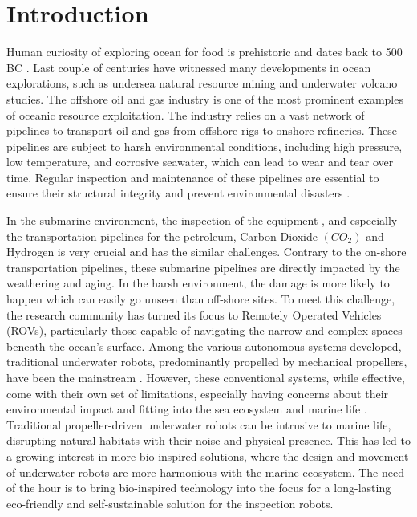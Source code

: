 \documentclass[pdflatex,sn-mathphys-num]{sn-jnl}
\theoremstyle{thmstyleone}%
\begin{document}
\section{Introduction}\label{intro}
\par Human curiosity of exploring ocean for food is prehistoric and dates back to 500 BC \cite{SUBMON}. Last couple of centuries have witnessed many developments in ocean explorations, such as undersea natural resource mining and underwater volcano studies. The offshore oil and gas industry is one of the most prominent examples of oceanic resource exploitation. The industry relies on a vast network of pipelines to transport oil and gas from offshore rigs to onshore refineries. These pipelines are subject to harsh environmental conditions, including high pressure, low temperature, and corrosive seawater, which can lead to wear and tear over time. Regular inspection and maintenance of these pipelines are essential to ensure their structural integrity and prevent environmental disasters \cite{Ho2020}.\par
In the submarine environment, the inspection of the equipment \cite{Shukla2016,Mcleod2012,Patel2024}, and especially the transportation pipelines for the petroleum, Carbon Dioxide $(CO_2)$ and Hydrogen is very crucial and has the similar challenges. Contrary to the on-shore transportation pipelines, these submarine pipelines are directly impacted by the weathering and aging. In the harsh environment, the damage is more likely to happen which can easily go unseen than off-shore sites. To meet this challenge, the research community has turned its focus to Remotely Operated Vehicles (ROVs), particularly those capable of navigating the narrow and complex spaces beneath the ocean's surface. Among the various autonomous systems developed, traditional underwater robots, predominantly propelled by mechanical propellers, have been the mainstream \cite{Capocci2017}.
However, these conventional systems, while effective, come with their own set of limitations, especially having concerns about their environmental impact and fitting into the sea ecosystem and marine life \cite{Polverino2013,Marras2012}. Traditional propeller-driven underwater robots can be intrusive to marine life, disrupting natural habitats with their noise and physical presence.  This has led to a growing interest in more bio-inspired solutions, where the design and movement of underwater robots are more harmonious with the marine ecosystem. The need of the hour is to bring bio-inspired technology into the focus for a long-lasting eco-friendly and self-sustainable solution for the inspection robots.\par
\end{document}
